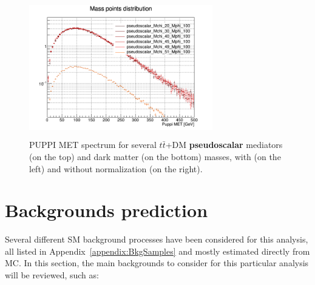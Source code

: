 \documentclass[a4paper, 10pt, openright]{report}
\begin{document}
\begin{figure}[htbp]
{\begin{minipage}[b]{.49\textwidth}
\includegraphics[width=8cm, height=6cm]{figs/pseudoscalarMETmChiLarge.png}
\end{minipage} \hfill
}
\caption{\ac{PUPPI} \ac{MET} spectrum for several $t \bar t$+DM \textbf{pseudoscalar} mediators (on the top) and dark matter (on the bottom) masses, with (on the left) and without normalization (on the right).}
\label{fig:signalPseudoscalar}
\end{figure}

\section{Backgrounds prediction} \label{section:Backgrounds}

Several different \ac{SM} background processes have been considered for this analysis, all listed in Appendix~\ref{appendix:BkgSamples} and mostly estimated directly from \ac{MC}. In this section, the main backgrounds to consider for this particular analysis will be reviewed, such as:
\end{document}
